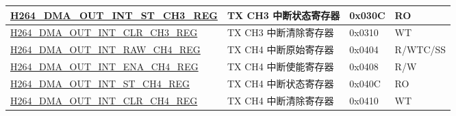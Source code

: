 \begin{longtable}{ | p{7.5cm} | p{5.7cm} | p{1.2cm} | p{1cm} | }
    \hyperref[regdesc:H264DMAOUTINTSTCH3REG]{H264\_DMA\_OUT\_INT\_ST\_CH3\_REG} & TX CH3 中断状态寄存器 & 0x030C & RO \\ \hline
    \hyperref[regdesc:H264DMAOUTINTCLRCH3REG]{H264\_DMA\_OUT\_INT\_CLR\_CH3\_REG} & TX CH3 中断清除寄存器 & 0x0310 & WT \\ \hline
    \hyperref[regdesc:H264DMAOUTINTRAWCH4REG]{H264\_DMA\_OUT\_INT\_RAW\_CH4\_REG} & TX CH4 中断原始寄存器 & 0x0404 & R/WTC/SS \\ \hline
    \hyperref[regdesc:H264DMAOUTINTENACH4REG]{H264\_DMA\_OUT\_INT\_ENA\_CH4\_REG} & TX CH4 中断使能寄存器 & 0x0408 & R/W \\ \hline
    \hyperref[regdesc:H264DMAOUTINTSTCH4REG]{H264\_DMA\_OUT\_INT\_ST\_CH4\_REG} & TX CH4 中断状态寄存器 & 0x040C & RO \\ \hline
    \hyperref[regdesc:H264DMAOUTINTCLRCH4REG]{H264\_DMA\_OUT\_INT\_CLR\_CH4\_REG} & TX CH4 中断清除寄存器 & 0x0410 & WT \\ \hline
    

\end{longtable}
